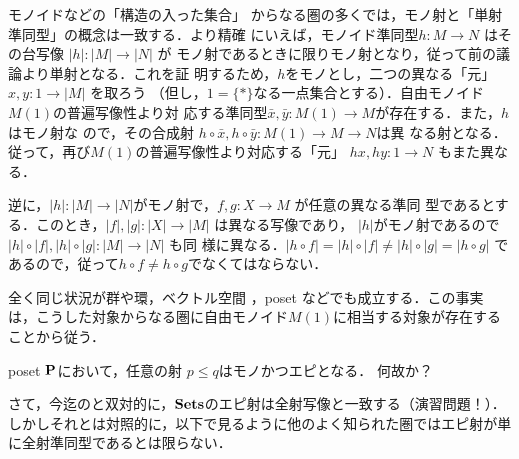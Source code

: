 \begin{example}\label{monos and injs}
 モノイドなどの「構造の入った集合」
 からなる圏の多くでは，モノ射と「単射準同型」の概念は一致する．より精確
 にいえば，モノイド準同型$h: M \to N$ はその台写像 $|h|: |M| \to |N|$ が
 モノ射であるときに限りモノ射となり，従って前の議論より単射となる．これを証
 明するため，$h$をモノとし，二つの異なる「元」$x, y: 1 \to |M|$ を取ろう
 （但し，$1 = \{*\}$なる一点集合とする）．自由モノイド$M(1)$の普遍写像性より対
 応する準同型$\bar x, \bar y: M(1) \to M$が存在する．また，$h$はモノ射な
 ので，その合成射 $h \circ \bar x, h \circ \bar y: M(1) \to M \to N$は異
 なる射となる．従って，再び$M(1)$の普遍写像性より対応する「元」
 $hx, hy: 1 \to N$ もまた異なる．
 \begin{center}
 \end{center}

 逆に，$|h|: |M| \to |N|$がモノ射で，$f, g: X \to M$ が任意の異なる準同
 型であるとする．このとき，$|f|, |g|: |X| \to |M|$ は異なる写像であり，
 $|h|$がモノ射であるので$|h| \circ |f|, |h| \circ |g|: |M| \to |N|$ も同
 様に異なる．$|h \circ f| = |h| \circ |f| \neq |h| \circ |g| = |h \circ g|$
 であるので，従って$h\circ f \neq h\circ g$でなくてはならない．
\end{example}
全く同じ状況が群や環，ベクトル空間
，poset などでも成立する．この事実
は，こうした対象からなる圏に自由モノイド$M(1)$に相当する対象が存在する
ことから従う．

\begin{example}\label{poset and mono/epi}
 poset ${\bf P}$において，任意の射 $p \leq q$はモノかつエピとなる．
 何故か？
\end{example}

さて，今迄のと双対的に，$\mathbf{Sets}$のエピ射は全射写像と一致する（演習問題！）．
しかしそれとは対照的に，以下で見るように他のよく知られた圏ではエピ射が単
に全射準同型であるとは限らない．

